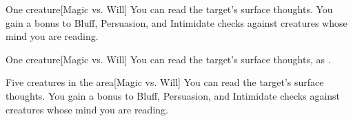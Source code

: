 \begin{comment}
\subsubsection{Q-R}
\end{comment}

\spellrng{\rngmed}
\begin{spelltarget}{One creature}[Magic vs. Will]
    \spellsuccess You can read the target's surface thoughts. You gain a  bonus to Bluff, Persuasion, and Intimidate checks against creatures whose mind you are reading.
\end{spelltarget}

\spellrng{\rngmed}
\begin{spelltarget}{One creature}[Magic vs. Will]
    \spelleffect You can read the target's surface thoughts, as .
\end{spelltarget}

\begin{spelltargets}{Five creatures in the area}[Magic vs. Will]
    \spellsuccess You can read the target's surface thoughts. You gain a  bonus to Bluff, Persuasion, and Intimidate checks against creatures whose mind you are reading.
\end{spelltargets}

